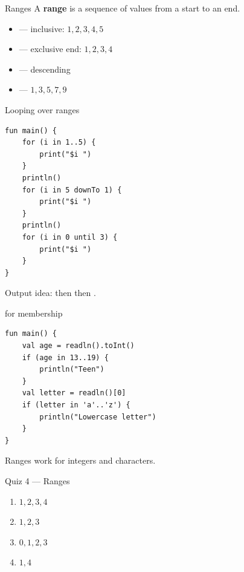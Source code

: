 \documentclass[aspectratio=169,11pt]{beamer}
\begin{document}
    \begin{frame}{Ranges}
        A \textbf{range} is a sequence of values from a start to an end.
        \vspace{0.5em}
        \begin{itemize}
            \item {} --- inclusive: $1,2,3,4,5$
            \item {} --- exclusive end: $1,2,3,4$
            \item {} --- descending
            \item {} --- $1,3,5,7,9$
        \end{itemize}
    \end{frame}

    \begin{frame}[fragile]{Looping over ranges}
        \begin{lstlisting}
fun main() {
    for (i in 1..5) {
        print("$i ")
    }
    println()
    for (i in 5 downTo 1) {
        print("$i ")
    }
    println()
    for (i in 0 until 3) {
        print("$i ")
    }
}
        \end{lstlisting}
        Output idea:  then  then .
    \end{frame}

    \begin{frame}[fragile]{ for membership}
        \begin{lstlisting}
fun main() {
    val age = readln().toInt()
    if (age in 13..19) {
        println("Teen")
    }
    val letter = readln()[0]
    if (letter in 'a'..'z') {
        println("Lowercase letter")
    }
}
        \end{lstlisting}
        Ranges work for integers and characters.
    \end{frame}

    \begin{frame}{Quiz 4 --- Ranges}
        \begin{enumerate}
            \item $1,2,3,4$
            \item $1,2,3$
            \item $0,1,2,3$
            \item $1,4$
        \end{enumerate}
        \quizpause
    \end{frame}
\end{document}
